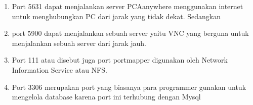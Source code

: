 \documentclass[12pt,a4paper]{article}
\begin{document}
\begin{enumerate}
\item Port 5631 dapat menjalankan server PCAanywhere menggunakan internet untuk menghubungkan PC dari jarak yang tidak dekat.
Sedangkan 
\item port 5900 dapat menjalankan sebuah server yaitu VNC yang berguna untuk menjalankan sebuah server dari jarak jauh.
\item Port 111 atau disebut juga port portmapper digunakan oleh Network Information Service atau NFS.
\item Port 3306 merupakan port yang biasanya para programmer gunakan untuk mengelola database karena port ini terhubung dengan Mysql


\end{enumerate}
\end{document}
